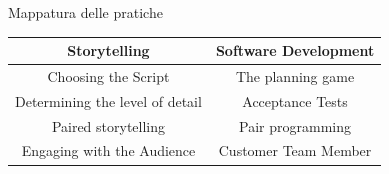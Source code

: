 \documentclass{beamer}
\begin{document}
\begin{frame}{\centerline{Mappatura delle pratiche}}
\setlength{\extrarowheight}{8pt}
\begin{table}[htbp]
\centering
\begin{tabular}{cc}
\hline
\textbf{Storytelling} & \textbf{Software Development} \\
\hline
Choosing the Script & The planning game \\
Determining the level of detail & Acceptance Tests \\
Paired storytelling & Pair programming \\
Engaging with the Audience & Customer Team Member \\
\hline
\end{tabular}
\end{table}
\end{frame}
\end{document}
